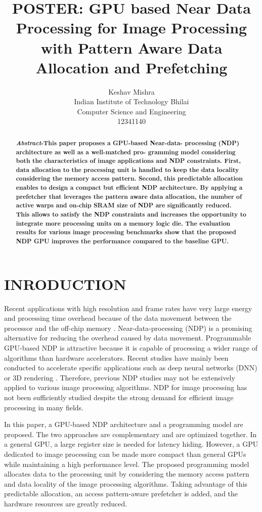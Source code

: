 \documentclass[onecolumn]{article}
\title{\textbf{POSTER: GPU based Near Data Processing for Image Processing with Pattern
		Aware Data Allocation and Prefetching}}
\author{Keshav Mishra\\Indian Institute of Technology Bhilai\\Computer Science and Engineering\\12341140}
\date{}
\begin{document}
	
	\maketitle
	
	\begin{abstract}
		\textbf{\textit{Abstract}-This paper proposes a GPU-based Near-data-
			processing (NDP) architecture as well as a well-matched pro-
			gramming model considering both the characteristics of image
			applications and NDP constraints. First, data allocation to the
			processing unit is handled to keep the data locality considering
			the memory access pattern. Second, this predictable allocation
			enables to design a compact but efficient NDP architecture. By
			applying a prefetcher that leverages the pattern aware data
			allocation, the number of active warps and on-chip SRAM
			size of NDP are significantly reduced. This allows to satisfy
			the NDP constraints and increases the opportunity to integrate
			more processing units on a memory logic die. The evaluation
			results for various image processing benchmarks show that the
			proposed NDP GPU improves the performance compared to
			the baseline GPU.}
	\end{abstract}

\section{INRODUCTION}
Recent applications with high resolution and frame rates have very large energy and processing time overhead because of the data movement between the processor and the off-chip memory \cite{ref1}. Near-data-processing (NDP) is a promising alternative for reducing the overhead caused by data movement. Programmable GPU-based NDP is attractive because it is capable of processing a wider range of algorithms than hardware accelerators. Recent studies have mainly been conducted to accelerate specific applications such as deep neural networks (DNN) \cite{ref2} or 3D rendering \cite{ref3}. Therefore, previous NDP studies may not be extensively applied to various image processing algorithms. NDP for image processing has not been sufficiently studied despite the strong demand for efficient image processing in many fields.

In this paper, a GPU-based NDP architecture and a programming model are proposed. The two approaches are complementary and are optimized together. In a general GPU, a large register size is needed for latency hiding. However, a GPU dedicated to image processing can be made more compact than general GPUs while maintaining a high performance level. The proposed programming model allocates data to the processing unit by considering the memory access pattern and data locality of the image processing algorithms. Taking advantage of this predictable allocation, an access pattern-aware prefetcher is added, and the hardware resources are greatly reduced.
\end{document}
